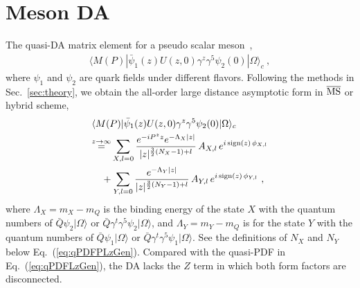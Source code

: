 \documentclass[a4paper,11pt]{article}
\begin{document}
\section{Meson DA}\label{sec:DA}
The quasi-DA matrix element for a pseudo scalar meson~\cite{LatticeParton:2022zqc,Zhang:2017bzy},
\begin{align}
\langle M(P) | \bar{\psi}_1(z) U(z,0) \gamma^z \gamma^5 \psi_{2}(0) | \Omega \rangle_c \ ,
\end{align}
where $\psi_1$ and $\psi_2$ are quark fields under different flavors. Following the methods in Sec.~\ref{sec:theory}, we obtain the all-order large distance asymptotic form in $\overline{\rm MS}$ or hybrid scheme,
\begin{align}\label{eq:qDALzGen}
&\langle M(P) | \bar{\psi}_1(z) U(z,0) \gamma^z \gamma^5 \psi_{2}(0) | \Omega \rangle_c  \nonumber\\
&{\overset{z\rightarrow \infty}{=}}   
 \sum_{X,l=0} \frac{e^{-i P^z z} e^{-\Lambda_X |z| }}{|z|^{\frac{3}{2}(N_X-1)+l}} \, A_{X,l} \, e^{i \, {\rm sign}(z) \, \phi_{X,l}} \nonumber\\
&\quad + \sum_{Y,l=0} \frac{e^{-\Lambda_Y |z|}}{|z|^{\frac{3}{2}(N_Y-1)+l}} \, A_{Y,l} \, e^{i \, {\rm sign}(z) \, \phi_{Y,l}}  \ ,
\end{align}
where $\Lambda_X=m_X-m_Q$ is the binding energy of the state $X$ with the quantum numbers of $\bar{Q} \psi_2 |\Omega\rangle$ or $\bar{Q} \gamma^t \gamma^5 \psi_2 |\Omega\rangle$, and $\Lambda_{Y}=m_Y-m_Q$ is for the state $Y$ with the quantum numbers of $\bar{Q} \psi_1 |\Omega\rangle$ or $\bar{Q} \gamma^t \gamma^5 \psi_1 |\Omega\rangle$. See the definitions of $N_X$ and $N_Y$ below Eq.~(\ref{eq:qPDFPLzGen}). Compared with the quasi-PDF in Eq.~(\ref{eq:qPDFLzGen}), the DA lacks the $Z$ term in which both form factors are disconnected. 
\end{document}
